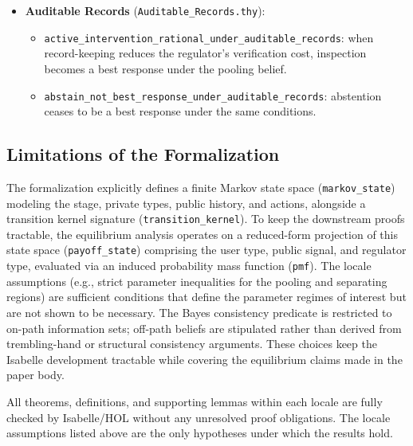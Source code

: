 \documentclass[review,authoryear]{elsarticle}
\theoremstyle{definition}
\theoremstyle{plain}
\begin{document}
\begin{itemize}
\begin{itemize}
      \end{itemize}
    \item \textbf{Auditable Records} (\texttt{Auditable\_\allowbreak{}Records.thy}):
      \begin{itemize}
        \item \texttt{active\_\allowbreak{}intervention\_\allowbreak{}rational\_\allowbreak{}under\_\allowbreak{}auditable\_\allowbreak{}records}: when record-keeping reduces the regulator's verification cost, inspection becomes a best response under the pooling belief.
        \item \texttt{abstain\_\allowbreak{}not\_\allowbreak{}best\_\allowbreak{}response\_\allowbreak{}under\_\allowbreak{}auditable\_\allowbreak{}records}: abstention ceases to be a best response under the same conditions.
      \end{itemize}
\end{itemize}

\subsection*{Limitations of the Formalization}

The formalization explicitly defines a finite Markov state space (\texttt{markov\_\allowbreak{}state}) modeling the stage, private types, public history, and actions, alongside a transition kernel signature (\texttt{transition\_\allowbreak{}kernel}). To keep the downstream proofs tractable, the equilibrium analysis operates on a reduced-form projection of this state space (\texttt{payoff\_\allowbreak{}state}) comprising the user type, public signal, and regulator type, evaluated via an induced probability mass function (\texttt{pmf}). The locale assumptions (e.g., strict parameter inequalities for the pooling and separating regions) are sufficient conditions that define the parameter regimes of interest but are not shown to be necessary. The Bayes consistency predicate is restricted to on-path information sets; off-path beliefs are stipulated rather than derived from trembling-hand or structural consistency arguments. These choices keep the Isabelle development tractable while covering the equilibrium claims made in the paper body.

All theorems, definitions, and supporting lemmas within each locale are fully checked by Isabelle/HOL without any unresolved proof obligations. The locale assumptions listed above are the only hypotheses under which the results hold.



\end{document}
